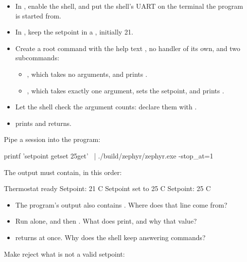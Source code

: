 \begin{itemize}
  \item In , enable the shell, and put the shell’s UART on the terminal the program is
    started from.
  \item In , keep the setpoint in a , initially 21.
  \item Create a root command  with the help text , no
    handler of its own, and two subcommands:
\begin{itemize}
  \item {}, which takes no arguments, and prints .
  \item {}, which takes exactly one argument, sets the setpoint, and prints .
\end{itemize}
  \item Let the shell check the argument counts: declare them with .
  \item {} prints  and returns.
\end{itemize}

Pipe a session into the program:

\begin{shell}
printf 'setpoint get\nsetpoint set 25\nsetpoint get\n' \
    | ./build/zephyr/zephyr.exe -stop_at=1
\end{shell}

\noindent The output must contain, in this order:

\begin{console}
Thermostat ready
Setpoint: 21 C
Setpoint set to 25 C
Setpoint: 25 C
\end{console}

\begin{itemize}
  \item The program’s output also contains . Where does that line come from?
  \item Run \code{setpoint} alone, and then \code{retval}. What does \code{retval} print, and why that
    value?
  \item {} returns at once. Why does the shell keep answering commands?
\end{itemize}

\label{c6:ex:1.2}

Make  reject what is not a valid setpoint:

